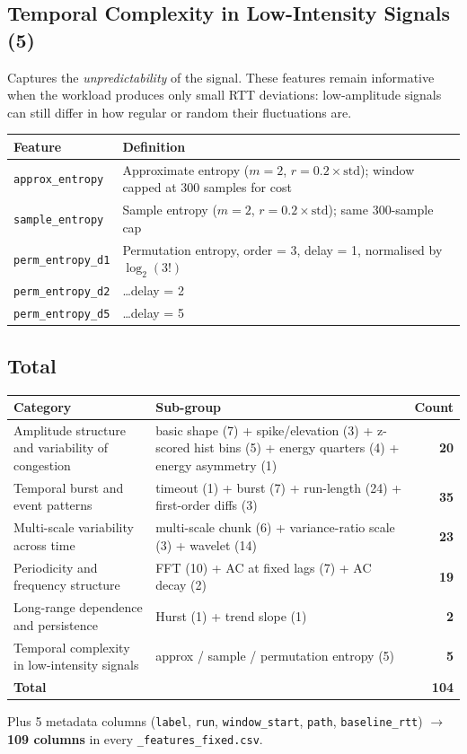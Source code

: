 \documentclass[11pt,a4paper]{article}
\begin{document}
\subsection{Temporal Complexity in Low-Intensity Signals (5)}

Captures the \emph{unpredictability} of the signal. These features remain
informative when the workload produces only small RTT deviations: low-amplitude
signals can still differ in how regular or random their fluctuations are.

\begin{tabular}{@{}lp{10cm}@{}}
\toprule
\textbf{Feature} & \textbf{Definition} \\
\midrule
\texttt{approx\_entropy}  & Approximate entropy ($m = 2$, $r = 0.2 \times \mathrm{std}$); window capped at 300 samples for cost \\
\texttt{sample\_entropy}  & Sample entropy ($m = 2$, $r = 0.2 \times \mathrm{std}$); same 300-sample cap \\
\texttt{perm\_entropy\_d1}& Permutation entropy, order = 3, delay = 1, normalised by $\log_2(3!)$ \\
\texttt{perm\_entropy\_d2}& \ldots delay = 2 \\
\texttt{perm\_entropy\_d5}& \ldots delay = 5 \\
\bottomrule
\end{tabular}

\subsection{Total}

\begin{longtable}{@{}p{6cm}p{7cm}r@{}}
\toprule
\textbf{Category} & \textbf{Sub-group} & \textbf{Count} \\
\midrule
\endhead
Amplitude structure and variability of congestion & basic shape (7) + spike/elevation (3) + z-scored hist bins (5) + energy quarters (4) + energy asymmetry (1) & \textbf{20} \\
Temporal burst and event patterns                  & timeout (1) + burst (7) + run-length (24) + first-order diffs (3) & \textbf{35} \\
Multi-scale variability across time                & multi-scale chunk (6) + variance-ratio scale (3) + wavelet (14) & \textbf{23} \\
Periodicity and frequency structure                & FFT (10) + AC at fixed lags (7) + AC decay (2) & \textbf{19} \\
Long-range dependence and persistence              & Hurst (1) + trend slope (1) & \textbf{2} \\
Temporal complexity in low-intensity signals       & approx / sample / permutation entropy (5) & \textbf{5} \\
\midrule
\textbf{Total} &  & \textbf{104} \\
\bottomrule
\end{longtable}

Plus 5 metadata columns (\texttt{label}, \texttt{run}, \texttt{window\_start},
\texttt{path}, \texttt{baseline\_rtt}) $\rightarrow$ \textbf{109 columns} in
every \texttt{\_features\_fixed.csv}.
\end{document}
